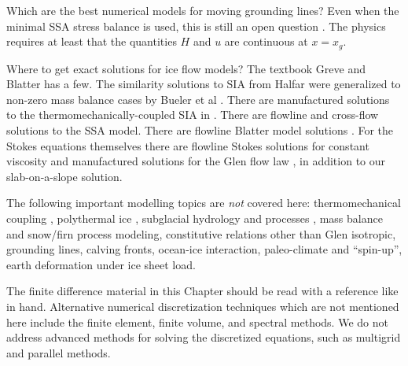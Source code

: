 \documentclass[titlepage,letterpaper,final,12pt]{scrartcl}
\begin{document}
Which are the best numerical models for moving grounding lines?  Even when the minimal SSA stress balance is used, this is still an open question \cite{SchoofMarine1,MISMIP2012}.  The physics requires at least that the quantities $H$ and $u$ are continuous at $x=x_g$.

Where to get exact solutions for ice flow models?  The textbook Greve and Blatter \cite{GreveBlatter2009} has a few.  The similarity solutions to SIA from Halfar \cite{Halfar81,Halfar83} were generalized to non-zero mass balance cases by Bueler et al \cite{BLKCB}.  There are manufactured solutions to the thermomechanically-coupled SIA in  \cite{BBL}.  There are flowline \cite{vanderVeen83} and cross-flow \cite{SchoofStream} solutions to the SSA model.  There are flowline Blatter model solutions \cite{GlowinskiRappaz}.  For the Stokes equations themselves there are flowline Stokes solutions for constant viscosity \cite{BaliseRaymond1985} and manufactured solutions for the Glen flow law \cite{JouvetRappaz2011,SargentFastook2010}, in addition to our slab-on-a-slope solution.

The following important modelling topics are \emph{not} covered here: thermomechanical coupling \cite{BBL}, polythermal ice \cite{Greve,AschwandenBuelerKhroulevBlatter}, subglacial hydrology and processes \cite{Clarke05}, mass balance and snow/firn process modeling, constitutive relations other than Glen isotropic, grounding lines, calving fronts, ocean-ice interaction, paleo-climate and ``spin-up'', earth deformation under ice sheet load.

The finite difference material in this Chapter should be read with a reference like \cite{MortonMayers} in hand.  Alternative numerical discretization techniques which are not mentioned here include the finite element, finite volume, and spectral methods.  We do not address advanced methods for solving the discretized equations, such as multigrid and parallel methods.

\footnotesize


\end{document}
